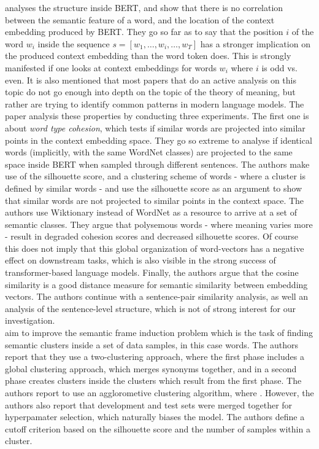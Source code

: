 \documentclass[a4paper,12pt,twoside,openright]{report}
\begin{document}
\cite{mickus19} analyses the structure inside BERT, and show that there is no correlation between the semantic feature of a word, and the location of the context embedding produced by BERT.
They go so far as to say that the position $i$ of the word $w_i$ inside the sequence $s = [w_1, \ldots, w_i, \ldots, w_T]$ has a stronger implication on the produced context embedding than the word token does.
This is strongly manifested if one looks at context embeddings for words $w_i$ where $i$ is odd vs. even.
It is also mentioned that most papers that do an active analysis on this topic do not go enough into depth on the topic of the theory of meaning, but rather are trying to identify common patterns in modern language models.
The paper analysis these properties by conducting three experiments.
The first one is about \textit{word type cohesion}, which tests if similar words are projected into similar points in the context embedding space.
They go so extreme to analyse if identical words (implicitly, with the same WordNet classes) are projected to the same space inside BERT when sampled through different sentences.
The authors make use of the silhouette score, and a clustering  scheme of words - where a cluster is defined by similar words - and use the silhouette score as an argument to show that similar words are not projected to similar points in the context space.
The authors use Wiktionary
instead of WordNet as a resource to arrive at a set of semantic classes.
They argue that polysemous words - where meaning varies more - result in degraded cohesion scores and decreased silhouette scores.
Of course this does not imply that this global organization of word-vectors has a negative effect on downstream tasks, which is also visible in the strong success of transformer-based language models.
Finally, the authors argue that the cosine similarity is a good distance measure for semantic similarity between embedding vectors.
The authors continue with a sentence-pair similarity analysis, as well an analysis of the sentence-level structure, which is not of strong interest for our investigation. \\

\cite{arefyev19} aim to improve the semantic frame induction problem which is the task of finding semantic clusters inside a set of data samples, in this case words.
The authors report that they use a two-clustering approach, where the first phase includes a global clustering approach, which merges synonyms together, and in a second phase creates clusters inside the clusters which result from the first phase.
The authors report to use an agglorometive clustering algorithm, where .
However, the authors also report that development and test sets were merged together for hyperpamater selection, which naturally biases the model.
The authors define a cutoff criterion based on the silhouette score and the number of samples within a cluster. \\
\end{document}
